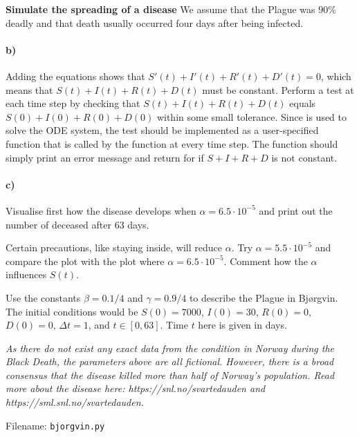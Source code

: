 \begin{Problem}{\textbf{Simulate the spreading of a disease}}
We assume that the Plague was $90 \%$ deadly and that death usually occurred four days after being infected.

\paragraph{b)}
Adding the equations shows that $S'(t) + I'(t) + R'(t) + D'(t) = 0$, which means that $S(t) + I(t) + R(t) + D(t)$ must be constant. Perform a test at each time step by checking that $S(t) + I(t) + R(t) + D(t)$ equals $S(0)+I(0)+R(0)+D(0)$ within some small tolerance. Since  is used to solve the ODE system, the test should be implemented as a user-specified  function that is called by the  function at every time step. The  function should simply print an error message and return  for if $S+I+R+D$ is not constant.

\paragraph{c)}
Visualise first how the disease develops when $\alpha = 6.5 \cdot 10 ^{-5}$ and  print out the number of deceased after 63 days.

Certain precautions, like staying inside, will reduce $\alpha$. Try $\alpha = 5.5 \cdot 10 ^{-5}$ and  compare the plot with the plot where $\alpha = 6.5 \cdot 10 ^{-5}$. Comment how the  $\alpha$ influences $S(t)$.

Use the constants $\beta = 0.1/4$ and $\gamma = 0.9/4$ to describe the Plague in Bjørgvin. The initial conditions would be $S(0) = 7000$, $I(0) = 30$, $R(0) = 0$, $D(0) = 0$, $\Delta t = 1$, and $t \in [0,63]$. Time $t$ here is given in days.

\emph{As there do not exist any exact data from the condition in Norway during the Black Death, the parameters above are all fictional. However, there is a broad consensus that the disease killed more than half of Norway's population. Read more about the disease here: https://snl.no/svartedauden and https://sml.snl.no/svartedauden.}

Filename: \texttt{bjorgvin.py}
\end{Problem}


